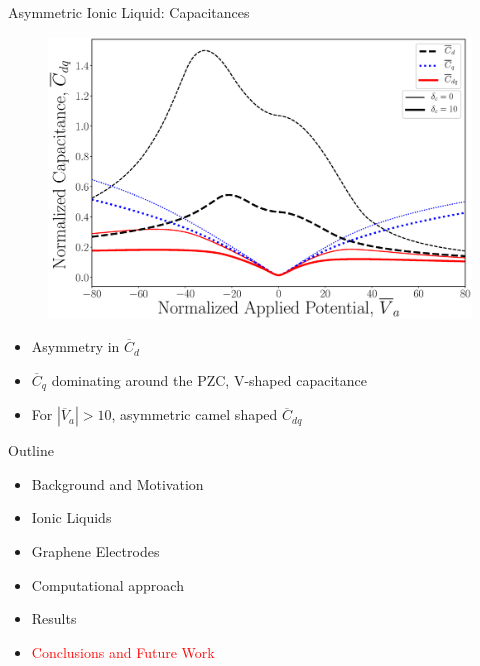 \documentclass{beamer}
\begin{document}
\begin{frame}{Asymmetric Ionic Liquid: Capacitances}
\begin{figure}[!h]
\begin{center}
\includegraphics[scale=0.15]{figure_9.eps}
\end{center}
\end{figure}
\begin{itemize}
    \item Asymmetry in $\overline{C}_d$
    \item $\overline{C}_q$ dominating around the PZC, V-shaped capacitance
    \item For $|\overline{V}_a| > 10$, asymmetric camel shaped $\overline{C}_{dq}$ 
\end{itemize}
\end{frame}{}

\begin{frame}{Outline}

\begin{itemize}
\item Background and Motivation\\
\item Ionic Liquids\\
\item Graphene Electrodes\\
\item Computational approach \\
\item Results \\
\item \textcolor{red}{Conclusions and Future Work}
\end{itemize}
\end{frame}
\end{document}
